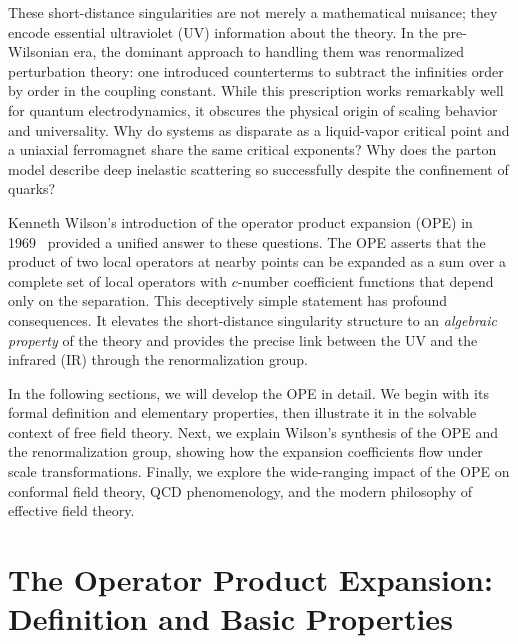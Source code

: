 \documentclass[11pt]{article}
\begin{document}
These short-distance singularities are not merely a mathematical nuisance; they encode essential ultraviolet (UV) information about the theory. In the pre-Wilsonian era, the dominant approach to handling them was renormalized perturbation theory: one introduced counterterms to subtract the infinities order by order in the coupling constant. While this prescription works remarkably well for quantum electrodynamics, it obscures the physical origin of scaling behavior and universality. Why do systems as disparate as a liquid-vapor critical point and a uniaxial ferromagnet share the same critical exponents? Why does the parton model describe deep inelastic scattering so successfully despite the confinement of quarks?

Kenneth Wilson's introduction of the operator product expansion (OPE) in 1969~\cite{Wilson:1969zs} provided a unified answer to these questions. The OPE asserts that the product of two local operators at nearby points can be expanded as a sum over a complete set of local operators with $c$-number coefficient functions that depend only on the separation. This deceptively simple statement has profound consequences. It elevates the short-distance singularity structure to an \emph{algebraic property} of the theory and provides the precise link between the UV and the infrared (IR) through the renormalization group.

In the following sections, we will develop the OPE in detail. We begin with its formal definition and elementary properties, then illustrate it in the solvable context of free field theory. Next, we explain Wilson's synthesis of the OPE and the renormalization group, showing how the expansion coefficients flow under scale transformations. Finally, we explore the wide-ranging impact of the OPE on conformal field theory, QCD phenomenology, and the modern philosophy of effective field theory.

\section{The Operator Product Expansion: Definition and Basic Properties}
\label{sec:definition}
\end{document}
